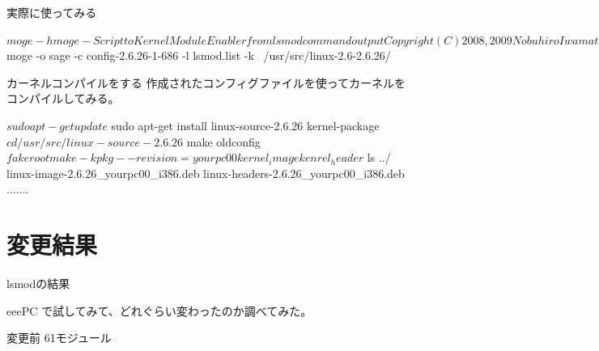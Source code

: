 \begin{frame}[containsverbatim]{ 実際に使ってみる}
\begin{commandline0}
$ moge -h
moge - Script to Kernel Module Enabler from lsmod command output

Copyright (C) 2008,2009 Nobuhiro Iwamatsu <iwamatsu@nigauri.org>
Usage: moge [options]
	-c, --configfile <file>   Kernel config file name
	-k, --kernel              Kernel source path
	-o, --output <file>       outout file
	-l, --lsmod               lsmod command output file
	-h, --help                display this help screen and exit
	-v, --version             show the version and exit

By Nobuhiro Iwamatsu <iwmatsu@nigauri.org>
$ moge -o sage -c config-2.6.26-1-686 -l lsmod.list -k \
                         /usr/src/linux-2.6-2.6.26/
\end{commandline0}
\end{frame}



\begin{frame}[containsverbatim]{カーネルコンパイルをする}
作成されたコンフィグファイルを使ってカーネルをコンパイルしてみる。

\begin{commandline0}
$ sudo apt-get update
$ sudo apt-get install linux-source-2.6.26 kernel-package
$ cd /usr/src/linux-source-2.6.26
$ make oldconfig
$ fakeroot make-kpkg --revision=yourpc00 kernel_image kenrel_header
$ ls ../
linux-image-2.6.26_yourpc00_i386.deb
linux-headers-2.6.26_yourpc00_i386.deb
.......
\end{commandline0}
\end{frame}

\section{変更結果}
\begin{frame}[containsverbatim]{lsmodの結果}

eeePC で試してみて、どれぐらい変わったのか調べてみた。

変更前 61モジュール
\end{frame}

